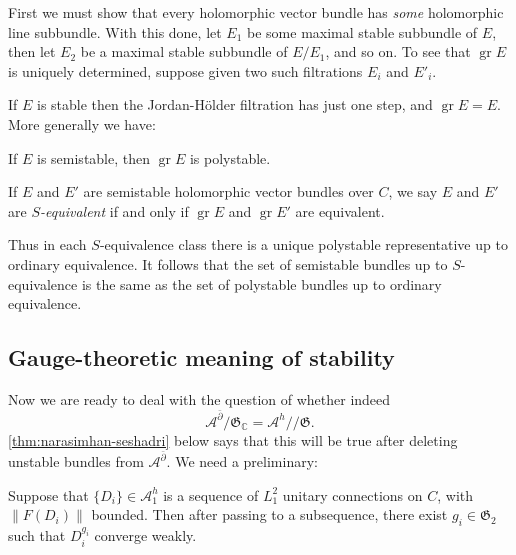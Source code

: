 \documentclass[12pt,letterpaper,reqno]{article}
\numberwithin{equation}{section}
\newcommand{\fG}{{\mathfrak G}}
\newcommand{\cA}{\ensuremath{\mathcal A}}
\newcommand{\C}{\ensuremath{\mathbb C}}
\newcommand{\kq}{/\!\!/}
\newcommand{\norm}[1]{\lVert#1\rVert}
\newcommand{\ti}[1]{\textit{#1}}
\DeclareMathOperator{\gr}{gr}
\newcommand{\fixme}[1]{{\color{orange}{[#1]}}}
\begin{document}
\begin{pf} First we must show that every holomorphic vector bundle
has \ti{some} holomorphic line subbundle. \fixme{...} With this done,
let $E_1$ be some maximal stable subbundle of $E$, then let $E_2$ be
a maximal stable subbundle of $E / E_1$, and so on.
To see that $\gr E$ is uniquely determined, suppose given two
such filtrations $E_i$ and $E'_i$. \fixme{...}
\end{pf}

If $E$ is stable then the Jordan-H\"older filtration has
just one step, and $\gr E = E$. More generally we have:

\begin{prop}
If $E$ is semistable, then $\gr E$ is polystable.
\end{prop}

\begin{defn}[$S$-equivalence] If $E$ and $E'$ are semistable 
holomorphic vector bundles over $C$, we say $E$ and $E'$ are
\ti{$S$-equivalent} if and only if $\gr E$ and $\gr E'$ are
equivalent.
\end{defn}

Thus in each $S$-equivalence class there is a unique polystable
representative up to ordinary equivalence. 
It follows that the set of semistable bundles
up to $S$-equivalence is the same as the set of polystable bundles 
up to ordinary equivalence.


\subsection{Gauge-theoretic meaning of stability}

Now we are ready to deal with the question of whether indeed
\begin{equation}
  \cA^{\bar\partial} / \fG_\C = \cA^h \kq \fG.
\end{equation}
\autoref{thm:narasimhan-seshadri} below says that this will be true
after deleting unstable bundles from $\cA^{\bar\partial}$.
We need a preliminary:

\begin{thm} \label{thm:uhlenbeck-weak}
Suppose that $\{D_i\} \in \cA^h_1$ is a sequence of $L^2_1$ unitary 
connections on $C$, with $\norm{F(D_i)}$ bounded. Then after passing
to a subsequence, there exist $g_i \in \fG_2$ such that $D_i^{g_i}$
converge weakly.
\end{thm}
\end{document}
